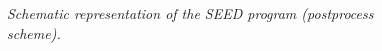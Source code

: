 \documentclass[a4paper,12pt,titlepage]{article}
\begin{document}
\begin{figure}
\vspace*{-1in}
\begin{center}
\end{center}
\caption{\it Schematic representation of the SEED program (postprocess scheme).}
\end{figure} 

\end{document}
